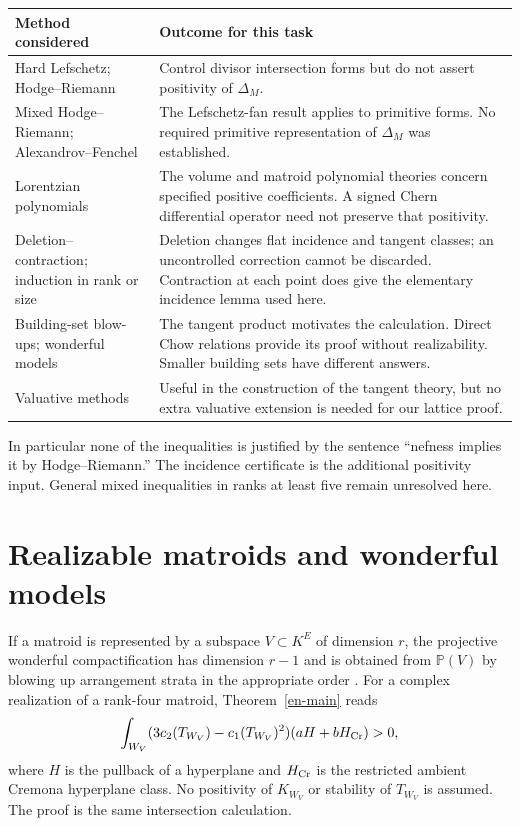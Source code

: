 \documentclass[12pt]{amsart}
\theoremstyle{definition}
\theoremstyle{remark}
\numberwithin{equation}{section}
\begin{document}
\begin{center}\small
\begin{tabularx}{\textwidth}{@{}p{3.6cm}X@{}}
\toprule
Method considered&Outcome for this task\\\midrule
Hard Lefschetz; Hodge--Riemann&Control divisor intersection forms but do not assert positivity of $\Delta_M$.\\
Mixed Hodge--Riemann; Alexandrov--Fenchel&The Lefschetz-fan result \cite[Theorem 5.20]{ADH} applies to primitive forms. No required primitive representation of $\Delta_M$ was established.\\
Lorentzian polynomials&The volume and matroid polynomial theories \cite{BH} concern specified positive coefficients. A signed Chern differential operator need not preserve that positivity.\\
Deletion--contraction; induction in rank or size&Deletion changes flat incidence and tangent classes; an uncontrolled correction cannot be discarded. Contraction at each point does give the elementary incidence lemma used here.\\
Building-set blow-ups; wonderful models&The tangent product motivates the calculation. Direct Chow relations provide its proof without realizability. Smaller building sets have different answers.\\
Valuative methods&Useful in the construction of the tangent theory, but no extra valuative extension is needed for our lattice proof.\\
\bottomrule
\end{tabularx}
\end{center}
In particular none of the inequalities is justified by the sentence ``nefness implies it by Hodge--Riemann.'' The incidence certificate is the additional positivity input. General mixed inequalities in ranks at least five remain unresolved here.

\section{Realizable matroids and wonderful models}
If a matroid is represented by a subspace $V\subset K^E$ of dimension $r$, the projective wonderful compactification has dimension $r-1$ and is obtained from $\mathbb P(V)$ by blowing up arrangement strata in the appropriate order \cite{DCP,CheG}. For a complex realization of a rank-four matroid, Theorem~\ref{en-main} reads
\[
 \int_{W_V}(3c_2(T_{W_V})-c_1(T_{W_V})^2)(aH+bH_{\rm Cr})>0,
\]
where $H$ is the pullback of a hyperplane and $H_{\rm Cr}$ is the restricted ambient Cremona hyperplane class. No positivity of $K_{W_V}$ or stability of $T_{W_V}$ is assumed. The proof is the same intersection calculation.
\end{document}
